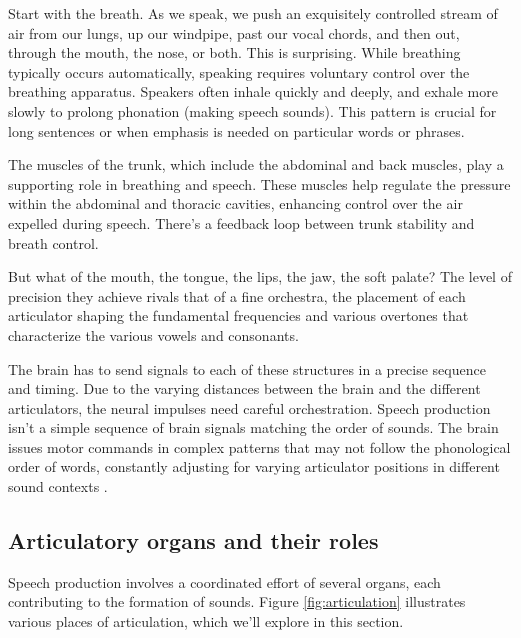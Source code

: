 Start with the breath. As we speak, we push an exquisitely controlled stream of air from our lungs, up our windpipe, past our vocal chords, and then out, through the mouth, the nose, or both. This is surprising. While breathing typically occurs automatically, speaking requires voluntary control over the breathing apparatus. Speakers often inhale quickly and deeply, and exhale more slowly to prolong phonation (making speech sounds). This pattern is crucial for long sentences or when emphasis is needed on particular words or phrases.

The muscles of the trunk, which include the abdominal and back muscles, play a supporting role in breathing and speech. These muscles help regulate the pressure within the abdominal and thoracic cavities, enhancing control over the air expelled during speech. There's a feedback loop between trunk stability and breath control.

But what of the mouth, the tongue, the lips, the jaw, the soft palate? The level of precision they achieve rivals that of a fine orchestra, the placement of each articulator shaping the fundamental frequencies and various overtones that characterize the various vowels and consonants. 

The brain has to send signals to each of these structures in a precise sequence and timing. Due to the varying distances between the brain and the different articulators, the neural impulses need careful orchestration. Speech production isn't a simple sequence of brain signals matching the order of sounds. The brain issues motor commands in complex patterns that may not follow the phonological order of words, constantly adjusting for varying articulator positions in different sound contexts \citep[108]{Tatham2006speech}.

\subsection{Articulatory organs and their roles}

Speech production involves a coordinated effort of several organs, each contributing to the formation of sounds. Figure \ref{fig:articulation} illustrates various places of articulation, which we'll explore in this section.

